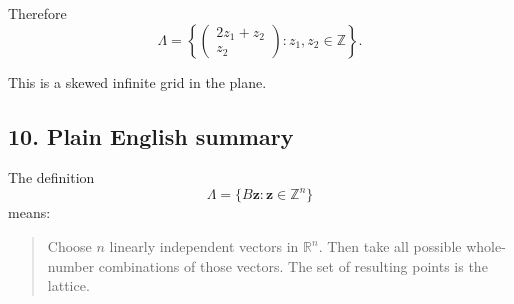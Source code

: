\documentclass[12pt]{article}
\begin{document}
	Therefore
	\[
	\Lambda
	=
	\left\{
	\begin{pmatrix}
		2z_1+z_2\\
		z_2
	\end{pmatrix}
	: z_1,z_2\in\mathbb{Z}
	\right\}.
	\]
	
	This is a skewed infinite grid in the plane.
	
	\subsection*{10. Plain English summary}
	
	The definition
	\[
	\Lambda=\{B\mathbf{z}:\mathbf{z}\in\mathbb{Z}^n\}
	\]
	means:
	
	\begin{quote}
		Choose \(n\) linearly independent vectors in \(\mathbb{R}^n\).  
		Then take all possible whole-number combinations of those vectors.  
		The set of resulting points is the lattice.
	\end{quote}
	
\end{document}
